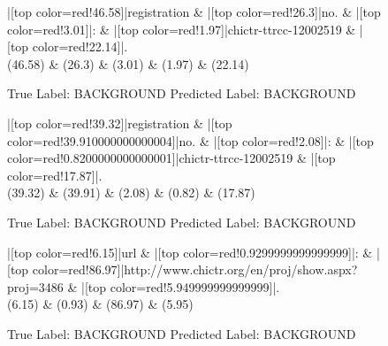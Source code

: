 \documentclass[a4paper, landscape]{article}
\begin{document}
\clearpage
\begin{figure}
\begin{center}
\begin{dependency}
\begin{deptext}
|[top color=red!46.58]|registration \& |[top color=red!26.3]|no. \& |[top color=red!3.01]|: \& |[top color=red!1.97]|chictr-ttrcc-12002519 \& |[top color=red!22.14]|.\\
(46.58) \& (26.3) \& (3.01) \& (1.97) \& (22.14)\\
\end{deptext}
\end{dependency}
\end{center}
\caption{True Label: BACKGROUND Predicted Label: BACKGROUND}
\end{figure}
\clearpage
\begin{figure}
\begin{center}
\begin{dependency}
\begin{deptext}
|[top color=red!39.32]|registration \& |[top color=red!39.910000000000004]|no. \& |[top color=red!2.08]|: \& |[top color=red!0.8200000000000001]|chictr-ttrcc-12002519 \& |[top color=red!17.87]|.\\
(39.32) \& (39.91) \& (2.08) \& (0.82) \& (17.87)\\
\end{deptext}
\end{dependency}
\end{center}
\caption{True Label: BACKGROUND Predicted Label: BACKGROUND}
\end{figure}
\clearpage
\begin{figure}
\begin{center}
\begin{dependency}
\begin{deptext}
|[top color=red!6.15]|url \& |[top color=red!0.9299999999999999]|: \& |[top color=red!86.97]|http://www.chictr.org/en/proj/show.aspx?proj=3486 \& |[top color=red!5.949999999999999]|.\\
(6.15) \& (0.93) \& (86.97) \& (5.95)\\
\end{deptext}
\end{dependency}
\end{center}
\caption{True Label: BACKGROUND Predicted Label: BACKGROUND}
\end{figure}
\end{document}

